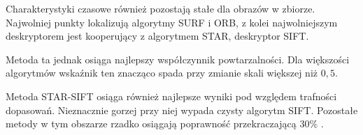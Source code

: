 Charakterystyki czasowe również pozostają stałe dla obrazów w zbiorze. Najwolniej punkty lokalizują algorytmy SURF i ORB, z kolei najwolniejszym deskryptorem jest kooperujący z algorytmem STAR, deskryptor SIFT.

Metoda ta jednak osiąga najlepszy współczynnik powtarzalności. Dla większości algorytmów wskaźnik ten znacząco spada przy zmianie skali większej niż $0,5$.

Metoda STAR-SIFT osiąga również najlepsze wyniki pod względem trafności dopasowań. Nieznacznie gorzej przy niej wypada czysty algorytm SIFT. Pozostałe metody w tym obszarze rzadko osiągają poprawność przekraczającą $30\% $ .
